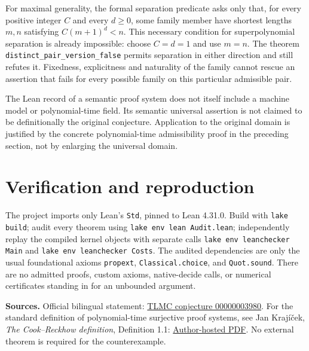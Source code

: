 \documentclass[11pt]{article}
\begin{document}
For maximal generality, the formal separation predicate asks only that, for every positive integer $C$ and every $d\geq0$, some family member have shortest lengths $m,n$ satisfying $C(m+1)^d<n$. This necessary condition for superpolynomial separation is already impossible: choose $C=d=1$ and use $m=n$. The theorem \texttt{distinct\_pair\_version\_false} permits separation in either direction and still refutes it. Fixedness, explicitness and naturality of the family cannot rescue an assertion that fails for every possible family on this particular admissible pair.

The Lean record of a semantic proof system does not itself include a machine model or polynomial-time field. Its semantic universal assertion is not claimed to be definitionally the original conjecture. Application to the original domain is justified by the concrete polynomial-time admissibility proof in the preceding section, not by enlarging the universal domain.

\section{Verification and reproduction}
The project imports only Lean's \texttt{Std}, pinned to Lean 4.31.0. Build with \texttt{lake build}; audit every theorem using \texttt{lake env lean Audit.lean}; independently replay the compiled kernel objects with separate calls \texttt{lake env leanchecker Main} and \texttt{lake env leanchecker Costs}. The audited dependencies are only the usual foundational axioms \texttt{propext}, \texttt{Classical.choice}, and \texttt{Quot.sound}. There are no admitted proofs, custom axioms, native-decide calls, or numerical certificates standing in for an unbounded argument.

\noindent\textbf{Sources.} Official bilingual statement:
\href{https://github.com/The-Last-Math-Competition/The-Last-Math-Competition/blob/main/conjectures/00000003980.md}{TLMC conjecture 00000003980}.
For the standard definition of polynomial-time surjective proof systems, see Jan Kraj\'i\v{c}ek, \emph{The Cook--Reckhow definition}, Definition 1.1:
\href{https://www2.karlin.mff.cuni.cz/~krajicek/cr.pdf}{Author-hosted PDF}.
No external theorem is required for the counterexample.
\end{document}
